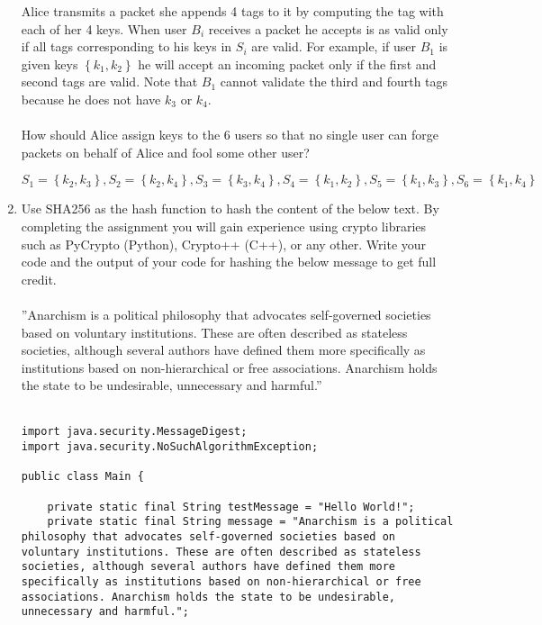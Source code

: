 \documentclass[a4paper]{article}
\begin{document}
\begin{enumerate}
			Alice transmits a packet she appends 4 tags to it by computing the tag with
			each of her 4 keys. When user $B_i$ receives a packet he accepts is as valid
			only if all tags corresponding to his keys in $S_i$ are valid. For example,
			if user $B_1$ is given keys $\left\{ k_1,k_2 \right\} $ he will accept an
			incoming packet only if the first and second tags are valid. Note that $B_1$ 
			cannot validate the third and fourth tags because he does not have $k_3$ or $k_4$.\\
			\\
			How should Alice assign keys to the 6 users so that no single user can forge
			packets on behalf of Alice and fool some other user?
			 \begin{center}
				\[
				S_1 = \left\{ k_2,k_3 \right\},
				S_2 = \left\{ k_2,k_4 \right\},
				S_3 = \left\{ k_3,k_4 \right\},
				S_4 = \left\{ k_1,k_2 \right\},
				S_5 = \left\{ k_1,k_3 \right\},
				S_6 = \left\{ k_1,k_4 \right\}
				\] 
			 \end{center}
		\item Use SHA256 as the hash function to hash the content of the below text. By
			completing the assignment you will gain experience using crypto libraries
			such as PyCrypto (Python), Crypto++ (C++), or any other. Write your code
			and the output of your code for hashing the below message to get full credit.\\
			\\
			''Anarchism is a political philosophy that advocates self-governed societies
			based on voluntary institutions. These are often described as stateless
			societies, although several authors have defined them more specifically as
			institutions based on non-hierarchical or free associations. Anarchism holds
			the state to be undesirable, unnecessary and harmful.''\\
			\\
			\begin{lstlisting}
import java.security.MessageDigest;
import java.security.NoSuchAlgorithmException;

public class Main {

	private static final String testMessage = "Hello World!";
	private static final String message = "Anarchism is a political philosophy that advocates self-governed societies based on voluntary institutions. These are often described as stateless societies, although several authors have defined them more specifically as institutions based on non-hierarchical or free associations. Anarchism holds the state to be undesirable, unnecessary and harmful.";


\end{lstlisting}
\end{enumerate}
\end{document}
